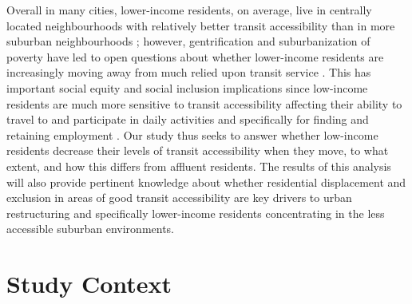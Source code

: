 Overall in many cities, lower-income residents, on average, live in centrally located neighbourhoods with relatively better transit accessibility than in more suburban neighbourhoods \cite{glaeser_why_2008,deboosere_evaluating_2018, allen_sizing_2019}; however, gentrification and suburbanization of poverty have led to open questions about whether lower-income residents are increasingly moving away from much relied upon transit service \cite{rayle_investigating_2015,zuk_gentrification_2018,delmelle_transit-induced_2021}. This has important social equity and social inclusion implications since low-income residents are much more sensitive to transit accessibility affecting their ability to travel to and participate in daily activities \cite{allen_planning_2020,barri_can_2021} and specifically for finding and retaining employment \cite{merlin_does_2017,fransen_relationship_2019,bastiaanssen_does_2021}. Our study thus seeks to answer whether low-income residents decrease their levels of transit accessibility when they move, to what extent, and how this differs from affluent residents. The results of this analysis will also provide pertinent knowledge about whether residential displacement and exclusion in areas of good transit accessibility are key drivers to urban restructuring and specifically lower-income residents concentrating in the less accessible suburban environments.



\section{Study Context}

